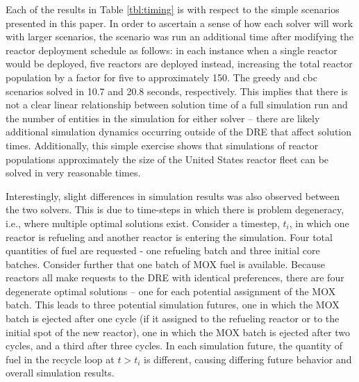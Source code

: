 Each of the results in Table \ref{tbl:timing} is with respect to the simple
scenarios presented in this paper. In order to ascertain a sense of how each
solver will work with larger scenarios, the \basecase scenario was run an
additional time after modifying the reactor deployment schedule as follows: in
each instance when a single reactor would be deployed, five reactors are
deployed instead, increasing the total reactor population by a factor for five
to approximately 150. The greedy and cbc \basecase scenarios solved in 10.7 and
20.8 seconds, respectively. This implies that there is not a clear linear
relationship between solution time of a full simulation run and the number of
entities in the simulation for either solver -- there are likely additional
simulation dynamics occurring outside of the DRE that affect solution
times. Additionally, this simple exercise shows that simulations of reactor
populations approximately the size of the United States reactor fleet can be
solved in very reasonable times.

Interestingly, slight differences in simulation results was also observed
between the two solvers. This is due to time-steps in which there is problem
degeneracy, i.e., where multiple optimal solutions exist. Consider a timestep,
$t_i$, in which one reactor is refueling and another reactor is entering the
simulation. Four total quantities of fuel are requested - one refueling batch
and three initial core batches. Consider further that one batch of MOX fuel is
available. Because reactors all make requests to the DRE with identical
preferences, there are four degenerate optimal solutions -- one for each
potential assignment of the MOX batch. This leads to three potential simulation
futures, one in which the MOX batch is ejected after one cycle (if it assigned
to the refueling reactor or to the initial spot of the new reactor), one in
which the MOX batch is ejected after two cycles, and a third after three
cycles. In each simulation future, the quantity of fuel in the recycle loop at
$t > t_i$ is different, causing differing future behavior and overall simulation
results.
